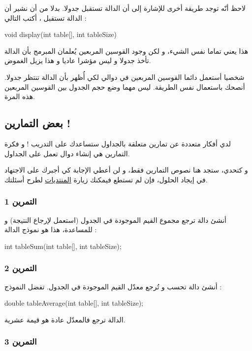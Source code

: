 لاحظ أنّه توجد طريقة أخرى للإشارة إلى أن الدالة تستقبل جدولا. بدلا من أن نشير أن الدالة تستقبل
،
أكتب التالي :
\begin{Csource}
void display(int table[], int tableSize)
\end{Csource}
هذا يعني تماما نفس الشيء، و لكن وجود القوسين المربعين يُعلمان المبرمج بأن الدالة تأخذ جدولا و ليس مؤشرا عاديا و هذا يزيل الغموض.

شخصيا أستعمل دائما القوسين المربعين في دوالي لكي أُظهر بأن الدالة تنتظر جدولا. أنصحك باستعمال نفس الطريقة. ليس مهما وضع حجم الجدول بين القوسين المربعين هذه المرة.

\subsection{بعض التمارين !}
لدي أفكار متعددة عن تمارين متعلقة بالجداول ستساعدك على التدريب ! و فكرة التمارين هي إنشاء دوال تعمل على الجداول.

و كتحدي، ستجد هنا نصوص  التمارين فقط، و لن أعطي الإجابة كي أجبرك على الاجتهاد في إيجاد الحلول، فإن لم تستطع فيمكنك زيارة 
\href{http://www.siteduzero.com/forum-81-126-langage-c.html}{المنتديات} 
لطرح أسئلتك.

\subsubsection{التمرين 1}

أنشئ دالة
ترجع مجموع القيم الموجودة في الجدول (استعمل
لإرجاع النتيجة) و  للمساعدة، هذا هو نموذج  الدالة :

\begin{Csource}
int tableSum(int table[], int tableSize);
\end{Csource}

\subsubsection{التمرين 2}

أنشئ دالة
تحسب و تُرجع معدّل القيم الموجودة في الجدول. تفضل النموذج :

\begin{Csource}
double tableAverage(int table[], int tableSize);
\end{Csource}

الدالة ترجع
فالمعدّل عادة هو قيمة عشرية.

\subsubsection{التمرين 3}

